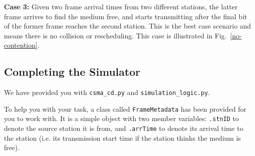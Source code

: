 \documentclass[11pt]{article}
\begin{document}
\textbf{Case 3:} Given two frame arrival times from two different stations, the latter frame arrives to find the medium free, and starts transmitting after the final bit of the former frame reaches the second station.
This is the best case scenario and means there is no collision or rescheduling.
This case is illustrated in Fig.~\ref{no-contention}.




\subsection{Completing the Simulator}
\label{subsec:complete-simulator}
We have provided you with \texttt{csma\_cd.py} and \texttt{simulation\_logic.py}.


To help you with your task, a class called \texttt{FrameMetadata} has been provided for you to work with.
It is a simple object with two member variables: \texttt{.stnID} to denote the source station it is from, and \texttt{.arrTime} to denote its arrival time to the station (i.e. its transmission start time if the station thinks the medium is free).


\end{document}
